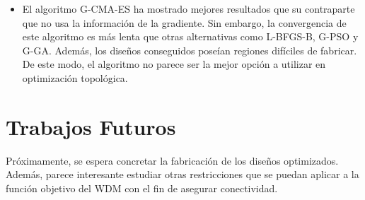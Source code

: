 \begin{itemize}
  \item El algoritmo G-CMA-ES ha mostrado mejores resultados que su contraparte que no usa la información
        de la gradiente. Sin embargo, la convergencia de este algoritmo es más lenta que otras alternativas
        como L-BFGS-B, G-PSO y G-GA. Además, los diseños conseguidos poseían regiones difíciles de fabricar.
        De este modo, el algoritmo no parece ser la mejor opción a utilizar en optimización topológica.

\end{itemize}

\section{Trabajos Futuros}

Próximamente, se espera concretar la fabricación de los diseños optimizados.
Además, parece interesante estudiar otras restricciones que se puedan aplicar a la función
objetivo del WDM con el fin de asegurar conectividad.
